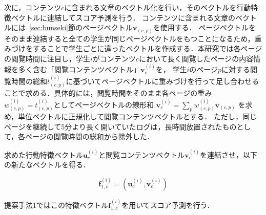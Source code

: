 \documentclass[a4paper,12pt]{ltjsreport}
\begin{document}
次に，コンテンツ${c}$に含まれる文章のベクトル化を行い，そのベクトルを行動特徴ベクトルに連結してスコア予測を行う．
コンテンツに含まれる文章のベクトルには~\ref{sec:bunseki}節のページベクトル$\bm{v}_{(c,p)}$を使用する．
ページベクトルをそのまま連結すると全ての学生が同じページベクトルをもつことになるため，重みづけをすることで学生ごとに違ったベクトルを作成する．本研究では各ページの閲覧時間に注目し，学生$i$がコンテンツ$c$において長く閲覧したページの内容情報を多く含む「閲覧コンテンツベクトル」$\bm{v}^{(i)}_c$を，
学生$i$のページ$p$に対する閲覧時間の総和$t^{(i)}_{(c,p)}$に基づいてページベクトルに重みづけを行って足し合わせることで求める．具体的には，閲覧時間をそのまま各ページの重み $w^{(i)}_{(c,p)} = t^{(i)}_{(c,p)}$としてページベクトルの線形和 $\bm{v}^{(i)}_c = \sum_p w^{(i)}_{(c,p)}\bm{v}_{(c,p)}$ を求め，単位ベクトルに正規化して閲覧コンテンツベクトルとする．
ただし，同じページを継続して5分より長く開いていたログは，長時間放置されたものとして，各ページの閲覧時間の総和から除外した．

求めた行動特徴ベクトル$\bm{u}^{(i)}_c$と閲覧コンテンツベクトル$\bm{v}^{(i)}_c$を連結させ，以下の新たなベクトルを得る．

\begin{equation}
\bm{f}_{1, c}^{(i)} = (\bm{u}_{c}^{(i)}, \bm{v}_{c}^{(i)})
\end{equation}

提案手法1ではこの特徴ベクトル$\bm{f}_{1, c}^{(i)}$を用いてスコア予測を行う．


\end{document}
